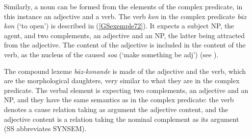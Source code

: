 \documentclass[output=paper
	        ,collection
	        ,collectionchapter
 	        ,biblatex
                ,babelshorthands
                ,newtxmath
                ,draftmode
                ,colorlinks, citecolor=brown
]{langscibook}
\begin{document}
{Similarly, a noun can be formed from the elements of the complex predicate, in this instance an adjective and a verb. The verb \emph{kon} in the complex predicate \emph{b\=az kon} (`to open') is described in (\ref{GSexemple72}). It expects a subject NP, the agent, and two complements, an adjective and an NP, the latter being attracted from the adjective. The content of the adjective is included in the content of the verb, as the nucleus of the caused \emph{soa} (`make something be adj') (see \citealt[642]{MuellerPersian-unlinked}).

\begin{exe}
\end{exe}

The compound lexeme \emph{b\=az-konande} is made of the adjective and the verb, which are the morphological daughters, very similar to what they are in the complex predicate. The verbal element is expecting two complements, an adjective and an NP, and they have the same semantics as in the complex predicate: the verb denotes a cause relation taking as argument the adjective content, and the adjective content is a relation taking the nominal complement as its argument (SS abbreviates SYNSEM). 

}
\end{document}
